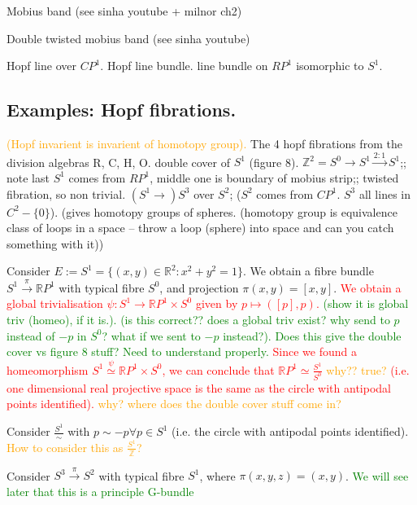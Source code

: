 \documentclass[a4paper]{article}
\theoremstyle{definition} \newtheorem*{definition}{Definition}
\theoremstyle{definition} \newtheorem*{definitions}{Definitions}
\theoremstyle{plain} \newtheorem{theorem}{Theorem}[section]
\theoremstyle{plain} \newtheorem{proposition}[theorem]{Proposition}
\theoremstyle{plain} \newtheorem{corollary}[theorem]{Corollary}
\theoremstyle{plain} \newtheorem{lemma}[theorem]{Lemma}
\theoremstyle{plain} \newtheorem{example}[theorem]{Example}
\newcommand{\checkCorrect}[1]{\textcolor{red}{#1}}
\newcommand{\understandBetter}[1]{\textcolor{orange}{#1}}
\newcommand{\question}[1]{\textcolor{orange}{#1}}
\newcommand{\finish}[1]{\textcolor{green}{#1}}
\newcommand{\realnos}{\mathbb{R}}
\begin{document}
Mobius band (see sinha youtube + milnor ch2)

Double twisted mobius band (see sinha youtube)

Hopf line over $CP^1$. 
Hopf line bundle. 
line bundle on $RP^1$ isomorphic to $S^1$. 

\subsection{Examples: Hopf fibrations.}
\understandBetter{(Hopf invarient is invarient of homotopy group).}
The 4 hopf fibrations from the division algebras R, C, H, O.
double cover of $S^1$ (figure 8). 
$\mathbb{Z}^2 = S^0 \to S^1 \xrightarrow{2:1} S^1$;; note last $S^1$ comes from $RP^1$, middle one is boundary of mobius strip;; twisted fibration, so non trivial.
$(S^1\to) S^3$ over $S^2$; ($S^2$ comes from $CP^1$. $S^3$ all lines in $C^2 - \{0\}$).
(gives homotopy groups of spheres. (homotopy group is equivalence class of loops in a space -- throw a loop (sphere) into space and can you catch something with it))

 Consider $E:=S^1=\{(x,y)\in \realnos^2:x^2+y^2=1\}$. We obtain a fibre bundle $S^1\xrightarrow{\pi} \realnos P^1$ with typical fibre $S^0$, and projection $\pi(x, y)=[x, y]$. \checkCorrect{We obtain a global trivialisation $\psi:S^1\to \realnos P^1\times S^0$ given by $p\mapsto ([p], p)$.} \finish{(show it is global triv (homeo), if it is.). (is this correct?? does a global triv exist? why send to $p$ instead of $-p$ in $S^0$? what if we sent to $-p$ instead?). Does this give the double cover vs figure 8 stuff? Need to understand properly.} \checkCorrect{Since we found a homeomorphism $S^1\overset{\psi}{\simeq} \realnos P^1\times S^0$, we can conclude that $\realnos P^1 \simeq \frac{S^1}{S^0}$ \question{why?? true?} (i.e. one dimensional real projective space is the same as the circle with antipodal points identified). \question{why?}} \question{where does the double cover stuff come in?}

Consider $\frac{S^1}{\sim}$ with $p\sim -p \forall p\in S^1$ (i.e. the circle with antipodal points identified). \question{How to consider this as $\frac{S^1}{\mathbb{Z}}$?}


Consider $S^3\xrightarrow{\pi} S^2$ with typical fibre $S^1$, where $\pi(x, y, z)=(x, y)$. \finish{We will see later that this is a principle G-bundle}
\end{document}
